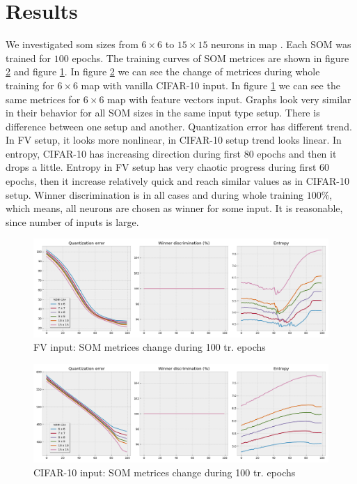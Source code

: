 \section{Results}
We investigated som sizes from $6\times6$ to $15\times15$ neurons in map .
Each SOM was trained for $100$ epochs. The training curves of SOM metrices are shown in figure \ref{fig:cifar-6n-99ep-stat} and figure \ref{fig:fv-6n-99ep-stat}. In figure \ref{fig:cifar-6n-99ep-stat} we can see the change of metrices during whole training for $6 \times 6$ map with vanilla CIFAR-10 input. In figure \ref{fig:fv-6n-99ep-stat} we can see the same metrices for $6 \times 6$ map with feature vectors input. 
 Graphs look very similar in their behavior for all SOM sizes in the same input type setup. There is difference between one setup and another. Quantization error has different trend. In FV setup, it looks more nonlinear, in CIFAR-10 setup trend looks linear. In entropy, CIFAR-10 has increasing direction during first $80$ epochs and then it drops a little. Entropy in FV setup has very chaotic progress during first $60$ epochs, then it increase relatively quick and reach similar values as in CIFAR-10 setup. Winner discrimination is in all cases and during whole training $100\%$, which means, all neurons are chosen as winner for some input. It is reasonable, since number of inputs is large.

\begin{figure}[h!]
    \centering
    \includegraphics[width=1\textwidth]{figs/fv-som-measures.png}
    \caption{FV input: SOM metrices change during 100 tr. epochs}
    \label{fig:fv-6n-99ep-stat}
\end{figure}

\begin{figure}[h!]
    \centering
    \includegraphics[width=1\textwidth]{figs/cifar-som-measures.png}
    \caption{CIFAR-10 input: SOM metrices change during 100 tr. epochs}
    \label{fig:cifar-6n-99ep-stat}
\end{figure}


